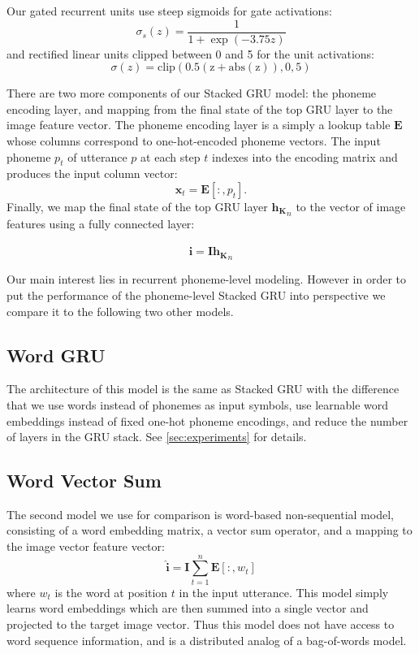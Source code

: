 Our gated recurrent units use steep sigmoids for gate activations: \[
\sigma_s(z) = \frac{1}{1 + \exp(-3.75z)} 
\]
and rectified linear units clipped between 0 and 5 for the unit
activations:
\[
\sigma(z) = \mathrm{clip(0.5(z+\mathrm{abs}(z)), 0, 5)}
\]

There are two more components of our {\sc Stacked GRU} model: the
phoneme encoding layer, and mapping from the final state of the top GRU
layer to the image feature vector.
The phoneme encoding layer is a simply a lookup table $\mathbf{E}$ whose
columns correspond to one-hot-encoded phoneme vectors. The input
phoneme $p_t$ of utterance $p$ at each step $t$ indexes into the
encoding matrix and produces the input column vector:
\begin{equation}
  \mathbf{x}_t = \mathbf{E}[:,p_t].
\end{equation}
Finally, we map the final state of the top GRU layer ${\mathbf{h_K}}_n$
to the vector of image features using a fully connected layer:

\begin{equation}
  \hat{\mathbf{i}} = \mathbf{I} {\mathbf{h_K}}_n
\end{equation}

Our main interest lies in  recurrent phoneme-level modeling. However in order to
put the performance of the phoneme-level {\sc Stacked GRU} into
perspective we compare it to the following two other models.


\subsection{Word GRU}
The architecture of this model is the same as {\sc Stacked GRU} with
the difference that we use words instead of phonemes as input symbols,
use learnable word embeddings instead of fixed one-hot phoneme
encodings, and reduce the number of layers in the GRU stack. See
\ref{sec:experiments} for details.
\subsection{Word Vector Sum}
The second model we use for comparison is word-based non-sequential
model, consisting of a word embedding matrix, a vector sum operator,
and a mapping to the image vector feature vector:
\begin{equation}
  \label{eq:sum}
  \hat{\mathbf{i}} = \mathbf{I} \sum_{t=1}^n \mathbf{E}[:,w_t]
\end{equation}
where $w_t$ is the word at position $t$ in the input utterance.
This model simply learns word embeddings which are then summed into a
single vector and projected to the target image vector. Thus this model does
not have access to word sequence information, and is a distributed
analog of a bag-of-words model.
